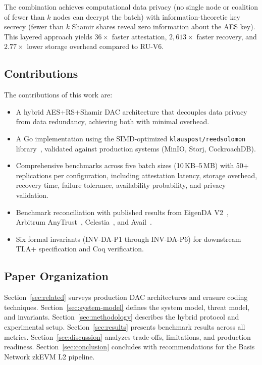 The combination achieves computational data privacy (no single node or
coalition of fewer than $k$ nodes can decrypt the batch) with
information-theoretic key secrecy (fewer than $k$ Shamir shares reveal
zero information about the AES key). This layered approach yields
$36\times$ faster attestation, $2{,}613\times$ faster recovery, and
$2.77\times$ lower storage overhead compared to RU-V6.

\subsection{Contributions}

The contributions of this work are:

\begin{itemize}
  \item A hybrid AES+RS+Shamir DAC architecture that decouples data
    privacy from data redundancy, achieving both with minimal overhead.
  \item A Go implementation using the SIMD-optimized
    \texttt{klauspost/reedsolomon} library~\cite{klauspost}, validated
    against production systems (MinIO, Storj, CockroachDB).
  \item Comprehensive benchmarks across five batch sizes (10\,KB--5\,MB)
    with 50+ replications per configuration, including attestation
    latency, storage overhead, recovery time, failure tolerance,
    availability probability, and privacy validation.
  \item Benchmark reconciliation with published results from EigenDA
    V2~\cite{eigenda2024v2}, Arbitrum AnyTrust~\cite{anytrust},
    Celestia~\cite{celestia}, and Avail~\cite{avail}.
  \item Six formal invariants (INV-DA-P1 through INV-DA-P6) for
    downstream TLA+ specification and Coq verification.
\end{itemize}

\subsection{Paper Organization}

Section~\ref{sec:related} surveys production DAC architectures and
erasure coding techniques. Section~\ref{sec:system-model} defines the
system model, threat model, and invariants.
Section~\ref{sec:methodology} describes the hybrid protocol and
experimental setup. Section~\ref{sec:results} presents benchmark
results across all metrics. Section~\ref{sec:discussion} analyzes
trade-offs, limitations, and production readiness.
Section~\ref{sec:conclusion} concludes with recommendations for the
Basis Network zkEVM L2 pipeline.
